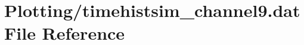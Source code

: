 \hypertarget{Plotting_2timehistsim__channel9_8dat}{}\section{Plotting/timehistsim\+\_\+channel9.dat File Reference}
\label{Plotting_2timehistsim__channel9_8dat}
